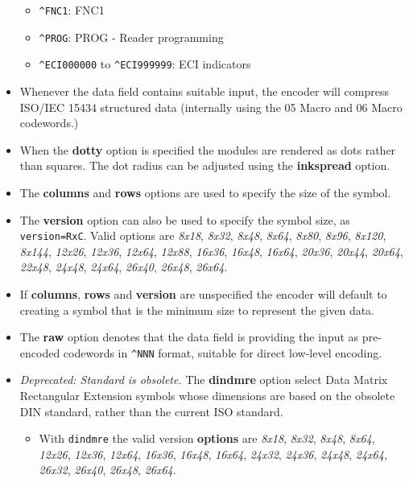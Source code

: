 \begin{itemize}
  \begin{itemize}
  \tightlist
  \item
    \texttt{\^{}FNC1}: FNC1
  \item
    \texttt{\^{}PROG}: PROG - Reader programming
  \item
    \texttt{\^{}ECI000000} to \texttt{\^{}ECI999999}: ECI indicators
  \end{itemize}
\item
  Whenever the data field contains suitable input, the encoder will
  compress ISO/IEC 15434 structured data (internally using the 05 Macro
  and 06 Macro codewords.)
\item
  When the \textbf{dotty} option is specified the modules are rendered
  as dots rather than squares. The dot radius can be adjusted using the
  \textbf{inkspread} option.
\item
  The \textbf{columns} and \textbf{rows} options are used to specify the
  size of the symbol.
\item
  The \textbf{version} option can also be used to specify the symbol
  size, as \texttt{version=RxC}. Valid options are \emph{8x18},
  \emph{8x32}, \emph{8x48}, \emph{8x64}, \emph{8x80}, \emph{8x96},
  \emph{8x120}, \emph{8x144}, \emph{12x26}, \emph{12x36}, \emph{12x64},
  \emph{12x88}, \emph{16x36}, \emph{16x48}, \emph{16x64}, \emph{20x36},
  \emph{20x44}, \emph{20x64}, \emph{22x48}, \emph{24x48}, \emph{24x64},
  \emph{26x40}, \emph{26x48}, \emph{26x64}.
\item
  If \textbf{columns}, \textbf{rows} and \textbf{version} are
  unspecified the encoder will default to creating a symbol that is the
  minimum size to represent the given data.
\item
  The \textbf{raw} option denotes that the data field is providing the
  input as pre-encoded codewords in \texttt{\^{}NNN} format, suitable
  for direct low-level encoding.
\item
  \emph{Deprecated: Standard is obsolete.} The \textbf{dindmre} option
  select Data Matrix Rectangular Extension symbols whose dimensions are
  based on the obsolete DIN standard, rather than the current ISO
  standard.

  \begin{itemize}
  \tightlist
  \item
    With \texttt{dindmre} the valid version \textbf{options} are
    \emph{8x18}, \emph{8x32}, \emph{8x48}, \emph{8x64}, \emph{12x26},
    \emph{12x36}, \emph{12x64}, \emph{16x36}, \emph{16x48},
    \emph{16x64}, \emph{24x32}, \emph{24x36}, \emph{24x48},
    \emph{24x64}, \emph{26x32}, \emph{26x40}, \emph{26x48},
    \emph{26x64}.
  \end{itemize}
\end{itemize}

